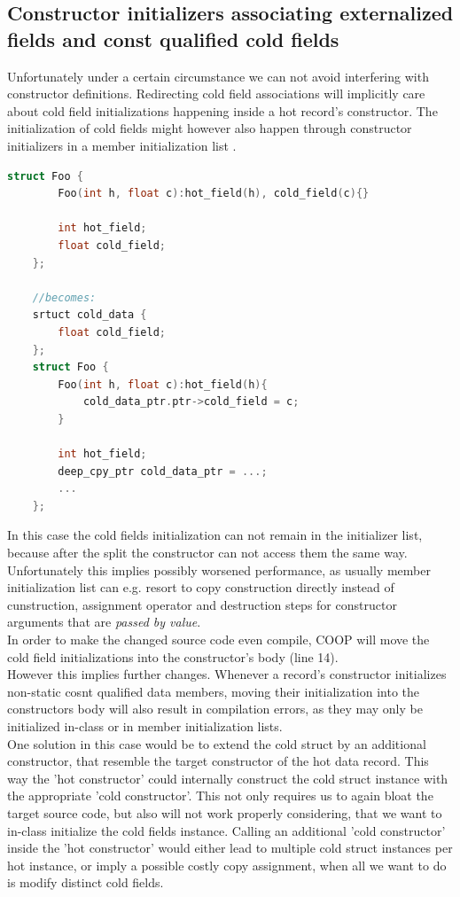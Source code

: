 \subsection{Constructor initializers associating externalized fields and const qualified cold fields}
Unfortunately under a certain circumstance we can not avoid interfering with constructor definitions. Redirecting cold field associations will implicitly care about cold field initializations happening inside a hot record's constructor. The initialization of cold fields might however also happen through constructor initializers in a member initialization list .
\begin{lstlisting}[language=C++, name={Simplified source transformations for problematic cold field initializations in initialization list.}, label={ctor_initializers}]
	struct Foo {
		Foo(int h, float c):hot_field(h), cold_field(c){}
	
		int hot_field;
		float cold_field;
	};
	
	//becomes:
	srtuct cold_data {
		float cold_field;
	};
	struct Foo {
		Foo(int h, float c):hot_field(h){
			cold_data_ptr.ptr->cold_field = c;
		}
	
		int hot_field;
		deep_cpy_ptr cold_data_ptr = ...;
		...
	};
\end{lstlisting}
In this case the cold fields initialization can not remain in the initializer list, because after the split the constructor can not access them the same way. Unfortunately this implies possibly worsened performance, as usually member initialization list can e.g. resort to copy construction directly instead of cunstruction, assignment operator and destruction steps for constructor arguments that are \textit{passed by value}.\\
In order to make the changed source code even compile, COOP will move the cold field initializations into the constructor's body (line 14).\\
However this implies further changes. Whenever a record's constructor initializes non-static cosnt qualified data members, moving their initialization into the constructors body will also result in compilation errors, as they may only be initialized in-class or in member initialization lists.\\
One solution in this case would be to extend the cold struct by an additional constructor, that resemble the target constructor of the hot data record. This way the 'hot constructor' could internally construct the cold struct instance with the appropriate 'cold constructor'. This not only requires us to again bloat the target source code, but also will not work properly considering, that we want to in-class initialize the cold fields instance. Calling an additional 'cold constructor' inside the 'hot constructor' would either lead to multiple cold struct instances per hot instance, or imply a possible costly copy assignment, when all we want to do is modify distinct cold fields.\\\\
